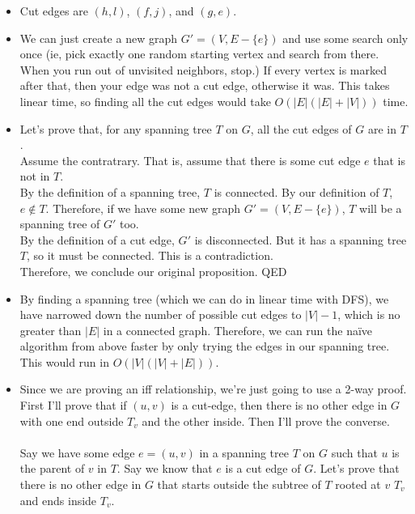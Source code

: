 \documentclass[11pt]{article}
\begin{document}
\begin{solution}
    \begin{itemize}
        \item Cut edges are $(h, l)$, $(f, j)$, and $(g, e)$.
        \item We can just create a new graph $G' = (V, E - \{e\})$ and use some search only once (ie, pick exactly one random starting vertex and search from there. When you run out of unvisited neighbors, stop.) If every vertex is marked after that, then your edge was not a cut edge, otherwise it was. This takes linear time, so finding all the cut edges would take $O(|E|(|E| + |V|))$ time.
        \item Let's prove that, for any spanning tree $T$ on $G$, all the cut edges of $G$ are in $T$. 
            \\ Assume the contratrary. That is, assume that there is some cut edge $e$ that is not in $T$. 
            \\ By the definition of a spanning tree, $T$ is connected. By our definition of $T$, $e \not \in T$. Therefore, if we have some new graph $G' = (V, E - \{e\})$, $T$ will be a spanning tree of $G'$ too.
            \\ By the definition of a cut edge, $G'$ is disconnected. But it has a spanning tree $T$, so it must be connected. This is a contradiction.
            \\ Therefore, we conclude our original proposition. QED
        \item By finding a spanning tree (which we can do in linear time with DFS), we have narrowed down the number of possible cut edges to $|V| - 1$, which is no greater than $|E|$ in a connected graph. Therefore, we can run the na\"{i}ve algorithm from above faster by only trying the edges in our spanning tree. This would run in $O(|V|(|V| + |E|))$.
        \item Since we are proving an iff relationship, we're just going to use a 2-way proof. First I'll prove that if $(u, v)$ is a cut-edge, then there is no other edge in $G$ with one end outside $T_v$ and the other inside. Then I'll prove the converse.
            \\ \\ Say we have some edge $e = (u, v)$ in a spanning tree $T$ on $G$ such that $u$ is the parent of $v$ in $T$. Say we know that $e$ is a cut edge of $G$. Let's prove that there is no other edge in $G$ that starts outside the subtree of $T$ rooted at $v$ $T_v$ and ends inside $T_v$.

\end{itemize}
\end{solution}
\end{document}

